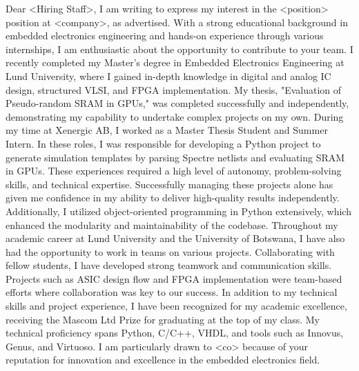 Dear <Hiring Staff>,
\newline{}
\newline{}
I am writing to express my interest in the <position> position at <company>, as advertised. With a strong educational background in embedded electronics engineering and hands-on experience through various internships, I am enthusiastic about the opportunity to contribute to your team.
\newline{}
\newline{}
I recently completed my Master's degree in Embedded Electronics Engineering at Lund University, where I gained in-depth knowledge in digital and analog IC design, structured VLSI, and FPGA implementation. My thesis, "Evaluation of Pseudo-random SRAM in GPUs," was completed successfully and independently, demonstrating my capability to undertake complex projects on my own.
\newline{}
\newline{}
During my time at Xenergic AB, I worked as a Master Thesis Student and Summer Intern. In these roles, I was responsible for developing a Python project to generate simulation templates by parsing Spectre netlists and evaluating SRAM in GPUs. These experiences required a high level of autonomy, problem-solving skills, and technical expertise. Successfully managing these projects alone has given me confidence in my ability to deliver high-quality results independently. Additionally, I utilized object-oriented programming in Python extensively, which enhanced the modularity and maintainability of the codebase.
\newline{}
\newline{}
Throughout my academic career at Lund University and the University of Botswana, I have also had the opportunity to work in teams on various projects. Collaborating with fellow students, I have developed strong teamwork and communication skills. Projects such as ASIC design flow and FPGA implementation were team-based efforts where collaboration was key to our success.
\newline{}
\newline{}
In addition to my technical skills and project experience, I have been recognized for my academic excellence, receiving the Mascom Ltd Prize for graduating at the top of my class. My technical proficiency spans Python, C/C++, VHDL, and tools such as Innovus, Genus, and Virtuoso.
\newline{}
\newline{}
I am particularly drawn to <co> because of your reputation for innovation and excellence in the embedded electronics field.
